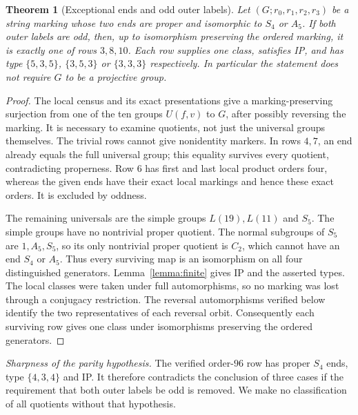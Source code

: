 \documentclass[11pt,a4paper]{article}
\newtheorem{theorem}{Theorem}
\begin{document}
\begin{theorem}[Exceptional ends and odd outer labels]\label{thm:finite}
Let $(G;r_0,r_1,r_2,r_3)$ be a string marking whose two ends are proper
and isomorphic to $S_4$ or $A_5$. If both outer labels are odd, then,
up to isomorphism preserving the ordered marking, it is exactly one of
rows $3,8,10$. Each row supplies one class, satisfies IP, and has type
$\{5,3,5\}$, $\{3,5,3\}$ or $\{3,3,3\}$ respectively.
In particular the statement does not require $G$ to be a projective group.
\end{theorem}
\begin{proof}
The local census and its exact presentations give a marking-preserving
surjection from one of the ten groups $U(f,v)$ to $G$, after possibly
reversing the marking. It is necessary to examine quotients, not just
the universal groups themselves. The trivial rows cannot give nonidentity
markers. In rows $4,7$, an end already equals the full universal group;
this equality survives every quotient, contradicting properness. Row $6$
has first and last local product orders four, whereas the given ends
have their exact local markings and hence these exact orders. It is
excluded by oddness.

The remaining universals are the simple groups $L(19),L(11)$ and $S_5$.
The simple groups have no nontrivial proper quotient. The normal subgroups
of $S_5$ are $1,A_5,S_5$, so its only nontrivial proper quotient is $C_2$,
which cannot have an end $S_4$ or $A_5$. Thus every surviving map is an
isomorphism on all four distinguished generators. Lemma~\ref{lemma:finite}
gives IP and the asserted types. The local classes were taken under full
automorphisms, so no marking was lost through a conjugacy restriction.
The reversal automorphisms verified below identify the two representatives
of each reversal orbit. Consequently each surviving row gives one class under isomorphisms
preserving the ordered generators.
\end{proof}

\noindent\emph{Sharpness of the parity hypothesis.} The verified order-$96$
row has proper $S_4$ ends, type $\{4,3,4\}$ and IP. It therefore
contradicts the conclusion of three cases if the requirement that both
outer labels be odd is removed. We make no classification of all quotients without that
hypothesis.
\end{document}
